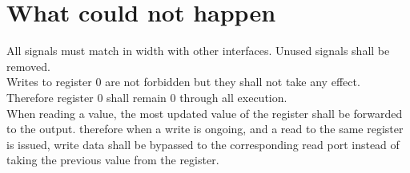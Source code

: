 \section{What could not happen}

All signals must match in width with other interfaces. Unused signals shall be removed.\\

Writes to register 0 are not forbidden but they shall not take any effect. Therefore register 0 shall remain 0 through all execution.\\

When reading a value, the most updated value of the register shall be forwarded to the output. therefore when a write is ongoing,
and a read to the same register is issued, write data shall be bypassed to the corresponding read port instead of taking the previous value from the register. 